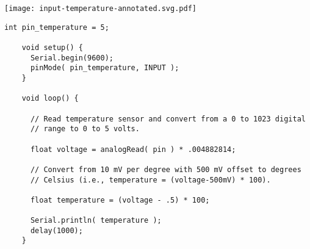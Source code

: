 \vspace{0.1in}
\begin{minipage}[t]{0.49\tw}
  \vspace{0.6in}

  \texttt{[image: input-temperature-annotated.svg.pdf]}
\end{minipage}
\hfill
\begin{minipage}[t]{0.49\tw}
  \vspace{0.1in}
  \begin{Verbatim}[gobble=3,fontsize=\small]
    int pin_temperature = 5;

    void setup() {
      Serial.begin(9600);
      pinMode( pin_temperature, INPUT );
    }

    void loop() {

      // Read temperature sensor and convert from a 0 to 1023 digital
      // range to 0 to 5 volts.

      float voltage = analogRead( pin ) * .004882814;

      // Convert from 10 mV per degree with 500 mV offset to degrees
      // Celsius (i.e., temperature = (voltage-500mV) * 100).

      float temperature = (voltage - .5) * 100;

      Serial.println( temperature );
      delay(1000);
    }
  \end{Verbatim}
\end{minipage}
\vspace{0.1in}

